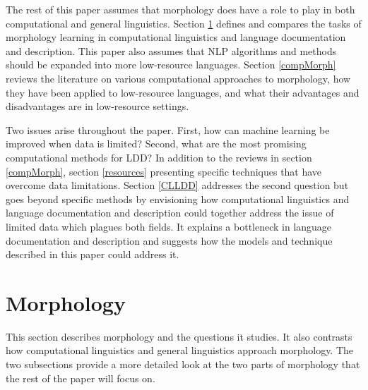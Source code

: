\documentclass[12pt]{article}
\begin{document}
The rest of this paper assumes that morphology does have a role to play in both computational and general linguistics. Section \ref{tasks} defines and compares the tasks of morphology learning in computational linguistics and language documentation and description. This paper also assumes that NLP algorithms and methods should be expanded into more low-resource languages. Section \ref{compMorph} reviews the literature on various computational approaches to morphology, how they have been applied to low-resource languages, and what their advantages and disadvantages are in low-resource settings.

Two issues arise throughout the paper. First, how can machine learning be improved when data is limited? Second, what are the most promising computational methods for LDD? In addition to the reviews in section \ref{compMorph}, section \ref{resources} presenting specific techniques that have overcome data limitations. Section \ref{CLLDD} addresses the second question but goes beyond specific methods by envisioning how computational linguistics and language documentation and description could together address the issue of limited data which plagues both fields. It explains a bottleneck in language documentation and description and suggests how the models and technique described in this paper could address it.

\section{Morphology}
\label{tasks}

This section describes morphology and the questions it studies. It also contrasts how computational linguistics and general linguistics approach morphology. The two subsections provide a more detailed look at the two parts of morphology that the rest of the paper will focus on.
\end{document}
